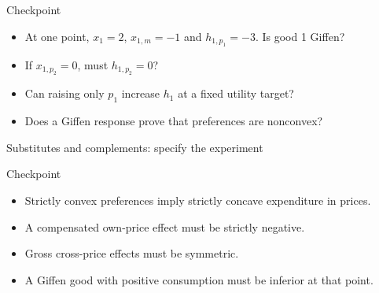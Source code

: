 \documentclass[handout,aspectratio=169,10pt]{beamer}
\begin{document}
\begin{frame}[label=checkpoint-slutsky]{Checkpoint}
\begin{itemize}\setlength{\itemsep}{.85em}
\item<1-> At one point, $x_1=2$, $x_{1,m}=-1$ and $h_{1,p_1}=-3$. Is good 1 Giffen?
\item<2-> If $x_{1,p_2}=0$, must $h_{1,p_2}=0$?
\item<3-> Can raising only $p_1$ increase $h_1$ at a fixed utility target?
\item<4-> Does a Giffen response prove that preferences are nonconvex?
\end{itemize}
\end{frame}

\begin{frame}[label=net-gross]{Substitutes and complements: specify the experiment}

\par
{}\par
{}\par
{}\par
\end{frame}

\begin{frame}[label=checkpoint]{Checkpoint}

\begin{itemize}\setlength{\itemsep}{.85em}
\item<1-> Strictly convex preferences imply strictly concave expenditure in prices.
\item<2-> A compensated own-price effect must be strictly negative.
\item<3-> Gross cross-price effects must be symmetric.
\item<4-> A Giffen good with positive consumption must be inferior at that point.
\end{itemize}
\end{frame}
\end{document}
